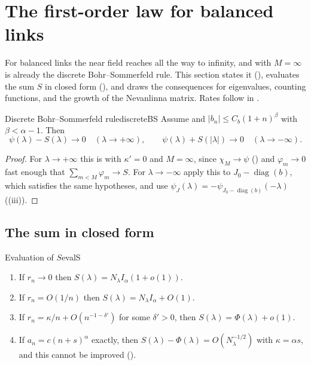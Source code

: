 \section{The first-order law for balanced links}\label{sec:balanced}

For balanced links the near field reaches all the way to infinity, and
 with $M=\infty$ is already the discrete Bohr--Sommerfeld rule. This
section states it (), evaluates the sum $S$ in closed form
(), and draws the consequences for eigenvalues, counting functions,
and the growth of the Nevanlinna matrix. Rates follow in .

\begin{theorem}{Discrete Bohr--Sommerfeld rule}{discreteBS}
Assume  and $|b_n|\le C_b(1+n)^\beta$ with $\beta<\alpha-1$. Then
\[
  \psi(\lambda)-S(\lambda)\to0\quad(\lambda\to+\infty),\qquad
  \psi(\lambda)+S(|\lambda|)\to0\quad(\lambda\to-\infty).
\]
\end{theorem}

\begin{proof}
For $\lambda\to+\infty$ this is  with $\kappa'=0$ and $M=\infty$, since
$\chi_M\to\psi$ () and $\varphi_m\to0$ fast enough that
$\sum_{m<M}\varphi_m\to S$. For $\lambda\to-\infty$ apply this to $J_0-\operatorname{diag}(b)$, which satisfies the
same hypotheses, and use $\psi_J(\lambda)=-\psi_{J_0-\operatorname{diag}(b)}(-\lambda)$ ((iii)).
\end{proof}

\subsection{The sum in closed form}

\begin{proposition}{Evaluation of $S$}{evalS}
\begin{enumerate}
\item[(a)] If $r_n\to0$ then $S(\lambda)=N_\lambda I_\alpha(1+o(1))$.
\item[(b)] If $r_n=O(1/n)$ then $S(\lambda)=N_\lambda I_\alpha+O(1)$.
\item[(c)] If $r_n=\kappa/n+O(n^{-1-\delta'})$ for some $\delta'>0$, then $S(\lambda)=\Phi(\lambda)+o(1)$.
\item[(d)] If $a_n=c(n+s)^\alpha$ exactly, then $S(\lambda)-\Phi(\lambda)=O(N_\lambda^{-1/2})$ with
  $\kappa=\alpha s$, and this cannot be improved ().
\end{enumerate}
\end{proposition}

